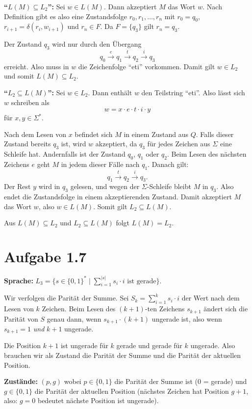 \documentclass[a4paper,12pt]{article}
\begin{document}
\medskip
\textbf{``$L(M) \subseteq L_2$'':}
Sei $w \in L(M)$. Dann akzeptiert $M$ das Wort $w$.
Nach Definition gibt es also eine Zustandsfolge $r_0,r_1,\ldots,r_n$ mit $r_0=q_0$, $r_{i+1}=\delta(r_i,w_{i+1})$ und $r_n \in F$.
Da $F=\{q_3\}$ gilt $r_n=q_3$.

Der Zustand $q_3$ wird nur durch den Übergang
\[
q_0 \xrightarrow{e} q_1 \xrightarrow{t} q_2 \xrightarrow{i} q_3
\]
erreicht.
Also muss in $w$ die Zeichenfolge ``eti'' vorkommen.
Damit gilt $w \in L_2$ und somit $L(M) \subseteq L_2$.

\medskip
\textbf{``$L_2 \subseteq L(M)$'':}
Sei $w \in L_2$. Dann enthält $w$ den Teilstring ``eti''.
Also lässt sich $w$ schreiben als
\[
w = x \cdot e \cdot t \cdot i \cdot y
\]
für $x,y \in \Sigma^*$.

Nach dem Lesen von $x$ befindet sich $M$ in einem Zustand aus $Q$.
Falls dieser Zustand bereits $q_3$ ist, wird $w$ akzeptiert, da $q_3$ für jedes Zeichen aus $\Sigma$ eine Schleife hat.
Andernfalls ist der Zustand $q_0$, $q_1$ oder $q_2$.
Beim Lesen des nächsten Zeichens $e$ geht $M$ in jedem dieser Fälle nach $q_1$.
Danach gilt:
\[
q_1 \xrightarrow{t} q_2 \xrightarrow{i} q_3.
\]
Der Rest $y$ wird in $q_3$ gelesen, und wegen der $\Sigma$-Schleife bleibt $M$ in $q_3$.
Also endet die Zustandsfolge in einem akzeptierenden Zustand.
Damit akzeptiert $M$ das Wort $w$, also $w \in L(M)$.
Somit gilt $L_2 \subseteq L(M)$.

\medskip
Aus $L(M) \subseteq L_2$ und $L_2 \subseteq L(M)$ folgt $L(M)=L_2$.

\section*{Aufgabe 1.7}

\textbf{Sprache:} $L_3 = \{s \in \{0,1\}^* \mid \sum_{i=1}^{|s|} s_i \cdot i \text{ ist gerade}\}$.

Wir verfolgen die Parität der Summe. Sei $S_k = \sum_{i=1}^{k} s_i \cdot i$ der Wert nach dem Lesen von $k$ Zeichen. Beim Lesen des $(k+1)$-ten Zeichens $s_{k+1}$ ändert sich die Parität von $S$ genau dann, wenn $s_{k+1} \cdot (k+1)$ ungerade ist, also wenn $s_{k+1} = 1$ \emph{und} $k+1$ ungerade.

Die Position $k+1$ ist ungerade für $k$ gerade und gerade für $k$ ungerade. Also brauchen wir als Zustand die Parität der Summe und die Parität der aktuellen Position.

\textbf{Zustände:} $(p, g)$ wobei $p \in \{0,1\}$ die Parität der Summe ist ($0$ = gerade) und $g \in \{0,1\}$ die Parität der aktuellen Position (nächstes Zeichen hat Position $g+1$, also: $g=0$ bedeutet nächste Position ist ungerade).
\end{document}
